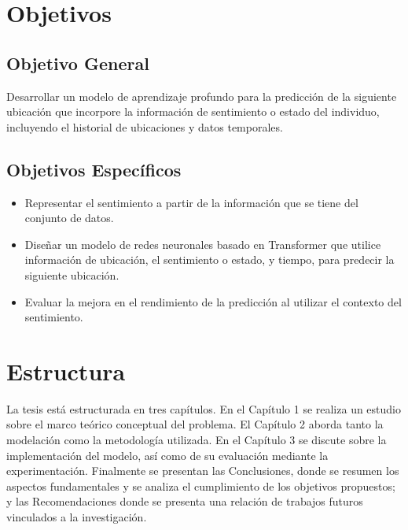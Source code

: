 \section{Objetivos}
\subsection{Objetivo General}

Desarrollar un modelo de aprendizaje profundo para la predicción de la siguiente ubicación que 
incorpore la información de sentimiento o estado del individuo, 
incluyendo el historial de ubicaciones y datos 
temporales.

\subsection{Objetivos Específicos}

\begin{itemize}
    \item Representar el sentimiento a partir de la información 
    que se tiene del conjunto de datos.
    \item Diseñar un modelo de redes neuronales basado en Transformer que utilice 
    información de ubicación, el sentimiento o estado, y tiempo, para predecir 
    la siguiente ubicación.
    \item Evaluar la mejora en el rendimiento de la predicción al 
    utilizar el contexto del sentimiento.
\end{itemize}

\section{Estructura}
La tesis est\'a estructurada en tres capítulos. En el 
Capítulo 1 se
realiza un estudio sobre el marco teórico conceptual del problema. 
El Capítulo 2 aborda tanto la modelación como la metodolog\'ia utilizada. 
En el Capítulo 3
se discute sobre la implementación del modelo, as\'i como de su 
evaluaci\'on mediante la experimentaci\'on. Finalmente se presentan las Conclusiones, 
donde se resumen los aspectos 
fundamentales y se analiza el cumplimiento de los objetivos 
propuestos; y las Recomendaciones donde se presenta una relaci\'on
de trabajos futuros vinculados a la investigación.\\
